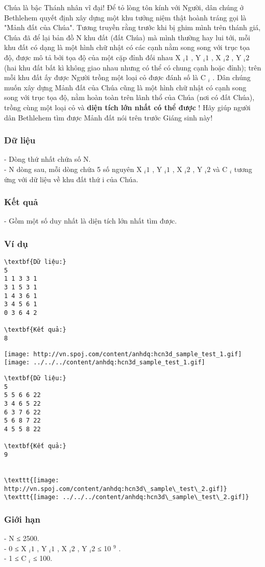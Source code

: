 

Chúa là bậc Thánh nhân vĩ đại! Để tỏ lòng tôn kính với Người, dân chúng ở Bethlehem quyết định xây dựng một khu tưởng niệm thật hoành tráng gọi là "Mảnh đất của Chúa". Tương truyền rằng trước khi bị ghim mình trên thánh giá, Chúa đã để lại bản đồ N khu đất (đất Chúa) mà mình thường hay lui tới, mỗi khu đất có dạng là một hình chữ nhật có các cạnh nằm song song với trục tọa độ, được mô tả bởi tọa độ của một cặp đỉnh đối nhau X $_ i1 $ , Y $_ i1 $ , X $_ i2 $ , Y $_ i2 $ (hai khu đất bất kì không giao nhau nhưng có thể có chung cạnh hoặc đỉnh); trên mỗi khu đất ấy được Người trồng một loại cỏ được đánh số là C $_ i $ . Dân chúng muốn xây dựng Mảnh đất của Chúa cũng là một hình chữ nhật có cạnh song song với trục tọa độ, nằm hoàn toàn trên lãnh thổ của Chúa (nơi có đất Chúa), trồng cùng một loại cỏ và \textbf{ diện tích lớn nhất có thể được } ! Hãy giúp người dân Bethlehem tìm được Mảnh đất nói trên trước Giáng sinh này!

\subsubsection{Dữ liệu}

- Dòng thứ nhất chứa số N.
\\- N dòng sau, mỗi dòng chứa 5 số nguyên X $_ i1 $ , Y $_ i1 $ , X $_ i2 $ , Y $_ i2 $ và C $_ i $ tương ứng với dữ liệu về khu đất thứ i của Chúa.

\subsubsection{Kết quả}

- Gồm một số duy nhất là diện tích lớn nhất tìm được.

\subsubsection{Ví dụ}
\begin{verbatim}
\textbf{Dữ liệu:}
5
1 1 3 3 1
3 1 5 3 1
1 4 3 6 1
3 4 5 6 1
0 3 6 4 2

\textbf{Kết quả:}
8
\end{verbatim}


\texttt{[image: http://vn.spoj.com/content/anhdq:hcn3d\_sample\_test\_1.gif]}
\texttt{[image: ../../../content/anhdq:hcn3d\_sample\_test\_1.gif]}
\begin{verbatim}
\textbf{Dữ liệu:}
5
5 5 6 6 22
3 4 6 5 22
6 3 7 6 22
5 6 8 7 22
4 5 5 8 22

\textbf{Kết quả:}
9


\texttt{[image: http://vn.spoj.com/content/anhdq:hcn3d\_sample\_test\_2.gif]}
\texttt{[image: ../../../content/anhdq:hcn3d\_sample\_test\_2.gif]}\end{verbatim}

\subsubsection{Giới hạn}

- N ≤ 2500.
\\- 0 ≤ X $_ i1 $ , Y $_ i1 $ , X $_ i2 $ , Y $_ i2 $ ≤ 10 $^ 9 $ .
\\- 1 ≤ C $_ i $ ≤ 100.

 
